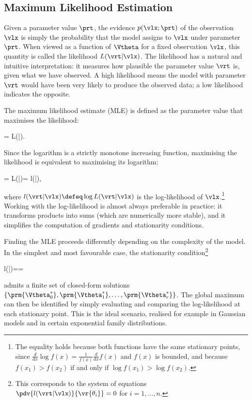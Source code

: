 \subsection*{Maximum Likelihood Estimation}

Given a parameter value $\prt$, the \alert{evidence} $p(\vlx;\prt)$ of the observation
$\vlx$ is simply the probability that the model assigns to $\vlx$ under parameter $\prt$.
When viewed as a function of $\Vtheta$ for a fixed observation $\vlx$, this quantity is
called the \alert{likelihood} $L(\vrt|\vlx)$. The likelihood has a natural and intuitive
interpretation: it measures how plausible the parameter value $\vrt$ is, given what we have
observed. A high likelihood means the model with parameter $\vrt$ would have been very
likely to produce the observed data; a low likelihood indicates the opposite.

The \alert{maximum likelihood estimate} (MLE) is defined as the parameter value that
maximises the likelihood:
\begin{myequation}
	\prts=\argmax{\Vtheta} L(\vrt|\vlx).
\end{myequation}
Since the logarithm is a strictly monotone increasing function, maximising the likelihood is
equivalent to maximising its logarithm:
\begin{myequation}
	\val\prts=\argmax{\Vtheta} \log L(\Vtheta|\ox)=\argmax{\Vtheta} l(\vrt|\vlx),
\end{myequation}
where $l(\vrt|\vlx)\defeq\log L(\vrt|\vlx)$ is the \alert{log-likelihood} of
$\vlx$.\footnote{The equality holds because both functions have the same stationary
points, since $\frac{d}{dx}\log f(x)=\frac{1}{f(x)}\frac{d}{dx}f(x)$ and $f(x)$ is
bounded, and because $f(x_1)>f(x_2)$ if and only if $\log f(x_1)>\log f(x_2)$.}
Working with the log-likelihood is almost always preferable in practice: it transforms
products into sums (which are numerically more stable), and it simplifies the computation
of gradients and stationarity conditions.

Finding the MLE proceeds differently depending on the complexity of the model. In the
simplest and most favourable case, the stationarity condition\footnote{This corresponds to
the system of equations $\pdv{l(\vrt|\vlx)}{\vr{\theta_i}}=0$ for $i=1,\ldots,n$.}
\begin{myequation}
	\gradient{\vrt} {l(\vrt|\vlx)}==\Zero
\end{myequation}
admits a finite set of closed-form solutions $\{\prm{\Vtheta_0^*}, \prm{\Vtheta_1^*},
\ldots, \prm{\Vtheta_r^*}\}$. The global maximum can then be identified by simply
evaluating and comparing the log-likelihood at each stationary point. This is the ideal
scenario, realised for example in Gaussian models and in certain exponential family
distributions.

